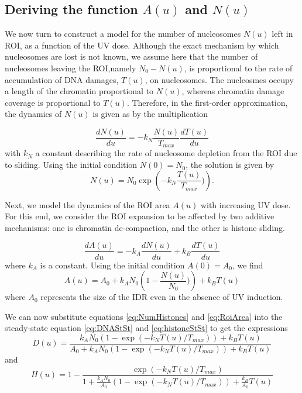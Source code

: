 \documentclass[12pt]{article}
\begin{document}
\subsection{Deriving the function $A(u)$ and $N(u)$}
We now turn to construct a model for the number of nucleosomes $N(u)$ left in ROI, as a function of the UV dose. Although the exact mechanism by which nucleosomes are lost is not known, we assume here that the number of nucleosomes leaving the ROI,namely  $N_0-N(u)$, is proportional to the rate of accumulation of DNA damages, $T(u)$, on nucleosomes. The nucleosmes occupy a length of the chromatin proportional to $N(u)$, whereas chromatin damage coverage is proportional to $T(u)$. Therefore, in the first-order approximation, the dynamics of $N(u)$ is given as by the multiplication 

\begin{equation*}
\frac{dN(u)}{du} = -k_N\frac{N(u)}{T_{max}}\frac{dT(u)}{du}
\end{equation*}
with $k_N$ a constant describing the rate of nucleosome depletion from the ROI due to sliding. Using the initial condition $N(0) = N_0$, the solution is given by
\begin{equation}\label{eq:NumHistones}
N(u) = N_0\exp\left(-k_N\frac{T(u)}{T_{max}})\right).
\end{equation}

Next, we model the dynamics of the ROI area $A(u)$ with increasing UV dose.  For this end, we consider the ROI expansion to be affected by two additive mechanisms: one is chromatin de-compaction, and the other is histone sliding. 

\begin{equation}\label{dralpha}
\frac{dA(u)}{du}=-k_A\frac{dN(u)}{du}+k_B\frac{dT(u)}{du}
\end{equation}
where $k_A$ is a constant. Using the initial condition $A(0)=A_0$, we find 
\begin{equation}\label{eq:RoiArea}
A(u) = A_0 +k_AN_0\left(1-\frac{N(u)}{N_0})\right) +k_BT(u)
\end{equation}
where $A_0$ represents the size of the IDR even in the absence of UV induction.

We can now substitute equations \ref{eq:NumHistones} and \ref{eq:RoiArea} into the steady-state equation \ref{eq:DNAStSt} and \ref{eq:histoneStSt} to get the expressions 
\begin{equation}
\label{eq:DnaLoss}
D(u) = \frac{k_AN_0\left(1-\exp\left(-k_NT(u)/T_{max}\right)\right) +k_BT(u)}{A_0+k_AN_0\left(1-\exp\left(-k_NT(u)/T_{max}\right)\right) +k_BT(u)}
\end{equation}
and 
\begin{equation}\label{eq:histoneLoss}
H(u) = 1- \frac{\exp\left(-k_NT(u)/T_{max}\right)}{1+\frac{k_AN_0}{A_0}\left(1-\exp\left(-k_NT(u)/T_{max}\right)\right) +\frac{k_B}{A_0}T(u)}
\end{equation}
\end{document}
